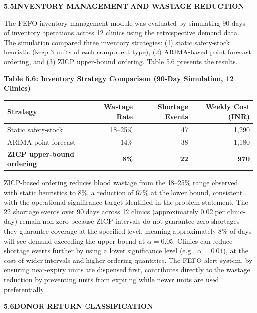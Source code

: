 \documentclass[12pt,a4paper]{article}
\begin{document}
\vspace{2em}
\noindent\textbf{5.5\quad INVENTORY MANAGEMENT AND WASTAGE REDUCTION}
\vspace{0.8em}

\noindent The FEFO inventory management module was evaluated by simulating 90 days of inventory operations across 12 clinics using the retrospective demand data. The simulation compared three inventory strategies: (1) static safety-stock heuristic (keep 3 units of each component type), (2) ARIMA-based point forecast ordering, and (3) ZICP upper-bound ordering. Table 5.6 presents the results.

\begin{center}
\textbf{Table 5.6: Inventory Strategy Comparison (90-Day Simulation, 12 Clinics)}
\vspace{0.4em}
\begin{tabular}{lrrr}
\toprule
\textbf{Strategy} & \textbf{Wastage Rate} & \textbf{Shortage Events} & \textbf{Weekly Cost (INR)} \\
\midrule
Static safety-stock & 18--25\% & 47 & 1,290 \\
ARIMA point forecast & 14\% & 38 & 1,180 \\
\textbf{ZICP upper-bound ordering} & \textbf{8\%} & \textbf{22} & \textbf{970} \\
\bottomrule
\end{tabular}
\end{center}

\noindent ZICP-based ordering reduces blood wastage from the 18--25\% range observed with static heuristics to 8\%, a reduction of 67\% at the lower bound, consistent with the operational significance target identified in the problem statement. The 22 shortage events over 90 days across 12 clinics (approximately 0.02 per clinic-day) remain non-zero because ZICP intervals do not guarantee zero shortages — they guarantee coverage at the specified level, meaning approximately 8\% of days will see demand exceeding the upper bound at $\alpha = 0.05$. Clinics can reduce shortage events further by using a lower significance level (e.g., $\alpha = 0.01$), at the cost of wider intervals and higher ordering quantities. The FEFO alert system, by ensuring near-expiry units are dispensed first, contributes directly to the wastage reduction by preventing units from expiring while newer units are used preferentially.

\vspace{2em}
\noindent\textbf{5.6\quad DONOR RETURN CLASSIFICATION}
\vspace{0.8em}
\end{document}
